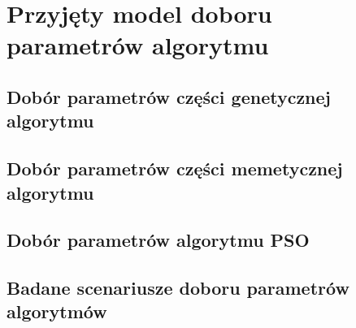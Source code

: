 \newpage
\chapter{Przyjęty model doboru parametrów algorytmu}

\section{Dobór parametrów części genetycznej algorytmu}

\section{Dobór parametrów części memetycznej algorytmu}

\section{Dobór parametrów algorytmu PSO}

\section{Badane scenariusze doboru parametrów algorytmów}
